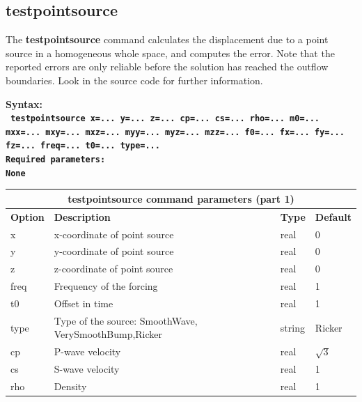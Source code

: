 \documentclass[11pt]{report}
\begin{document}
\subsection{testpointsource}
\label{keyword:pointsource}
The {\bf testpointsource} command calculates the displacement due to a point source in a homogeneous
whole space, and computes the error. Note that the reported errors are only reliable before the
solution has reached the outflow boundaries. Look in the source code for further information.
\begin{flushleft}
\bf
Syntax:\\
\tt
testpointsource
x=... y=... z=... cp=... cs=... rho=... m0=... mxx=... mxy=... mxz=... myy=... myz=... mzz=... f0=... fx=... fy=... fz=... freq=... t0=... type=...
\\
\bf 
Required parameters:\\
\rm
None
\end{flushleft}
\begin{center}
\begin{tabular}{|l|p{8cm}|l|l|} \hline
\multicolumn{4}{|c|}{\bf testpointsource command parameters (part 1)}\\ \hline
\bf{Option} & \bf{Description} & \bf{Type} & \bf{Default} \\ \hline \hline
x    & x-coordinate of point source & real & 0 \\ \hline
y    & y-coordinate of point source & real & 0 \\ \hline
z    & z-coordinate of point source & real & 0 \\ \hline
\hline
freq & Frequency of the forcing & real & 1 \\ \hline
t0   & Offset in time & real & 1 \\ \hline
type & Type of the source: SmoothWave, VerySmoothBump,Ricker & string & Ricker \\ \hline
\hline
cp   & P-wave velocity & real & $\sqrt{3}$ \\ \hline
cs   & S-wave velocity & real & 1 \\ \hline
rho  & Density & real & 1 \\ \hline
\end{tabular}
\end{center}
\end{document}
